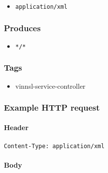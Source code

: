 \begin{itemize}
\tightlist
\item
  \texttt{application/xml}
\end{itemize}

\subsubsection{Produces}\label{produces}

\begin{itemize}
\tightlist
\item
  \texttt{*/*}
\end{itemize}

\subsubsection{Tags}\label{tags}

\begin{itemize}
\tightlist
\item
  vinnsl-service-controller
\end{itemize}

\subsubsection{Example HTTP request}\label{example-http-request}

\paragraph{Header}\label{header}

\begin{verbatim}
Content-Type: application/xml
\end{verbatim}

\paragraph{Body}\label{body}

